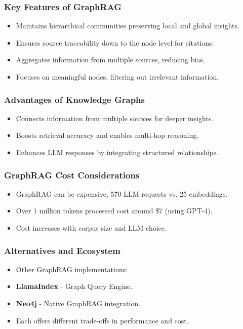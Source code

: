 \begin{frame}[fragile]\frametitle{Key Features of GraphRAG}
    \begin{itemize}
        \item Maintains hierarchical communities preserving local and global insights.
        \item Ensures source traceability down to the node level for citations.
        \item Aggregates information from multiple sources, reducing bias.
        \item Focuses on meaningful nodes, filtering out irrelevant information.
    \end{itemize}
\end{frame}

\begin{frame}[fragile]\frametitle{Advantages of Knowledge Graphs}
    \begin{itemize}
        \item Connects information from multiple sources for deeper insights.
        \item Boosts retrieval accuracy and enables multi-hop reasoning.
        \item Enhances LLM responses by integrating structured relationships.
    \end{itemize}
\end{frame}

\begin{frame}[fragile]\frametitle{GraphRAG Cost Considerations}
  \begin{itemize}
    \item GraphRAG can be expensive, 570 LLM requests vs. 25 embeddings.
    \item Over 1 million tokens processed cost around \$7 (using GPT-4).
    \item Cost increases with corpus size and LLM choice.
  \end{itemize}
\end{frame}

\begin{frame}[fragile]\frametitle{Alternatives and Ecosystem}
  \begin{itemize}
    \item Other GraphRAG implementations:
    \item \textbf{LlamaIndex} - Graph Query Engine.
    \item \textbf{Neo4j} - Native GraphRAG integration.
    \item Each offers different trade-offs in performance and cost.
  \end{itemize}
\end{frame}

